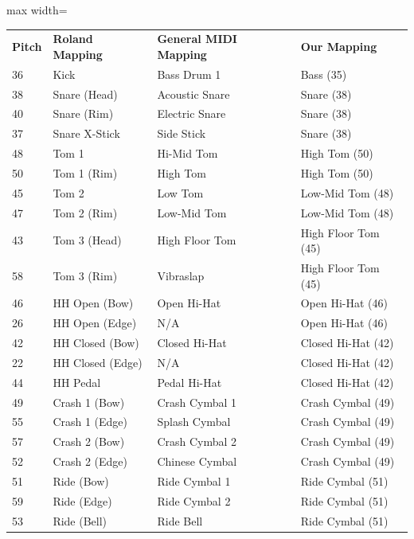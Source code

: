 \documentclass[sigconf]{nimeart}
\begin{document}
{\def\LTcaptype{none} %
\begin{table}[htbp]\centering\small
\begin{adjustbox}{max width=\textwidth}\begin{tabular}{llll}
\toprule\noalign{}
\midrule
\textbf{Pitch} & \textbf{Roland Mapping} & \textbf{General MIDI Mapping} & \textbf{Our Mapping} \\
36 & Kick & Bass Drum 1 & Bass (35) \\
38 & Snare (Head) & Acoustic Snare & Snare (38) \\
40 & Snare (Rim) & Electric Snare & Snare (38) \\
37 & Snare X-Stick & Side Stick & Snare (38) \\
48 & Tom 1 & Hi-Mid Tom & High Tom (50) \\
50 & Tom 1 (Rim) & High Tom & High Tom (50) \\
45 & Tom 2 & Low Tom & Low-Mid Tom (48) \\
47 & Tom 2 (Rim) & Low-Mid Tom & Low-Mid Tom (48) \\
43 & Tom 3 (Head) & High Floor Tom & High Floor Tom (45) \\
58 & Tom 3 (Rim) & Vibraslap & High Floor Tom (45) \\
46 & HH Open (Bow) & Open Hi-Hat & Open Hi-Hat (46) \\
26 & HH Open (Edge) & N/A & Open Hi-Hat (46) \\
42 & HH Closed (Bow) & Closed Hi-Hat & Closed Hi-Hat (42) \\
22 & HH Closed (Edge) & N/A & Closed Hi-Hat (42) \\
44 & HH Pedal & Pedal Hi-Hat & Closed Hi-Hat (42) \\
49 & Crash 1 (Bow) & Crash Cymbal 1 & Crash Cymbal (49) \\
55 & Crash 1 (Edge) & Splash Cymbal & Crash Cymbal (49) \\
57 & Crash 2 (Bow) & Crash Cymbal 2 & Crash Cymbal (49) \\
52 & Crash 2 (Edge) & Chinese Cymbal & Crash Cymbal (49) \\
51 & Ride (Bow) & Ride Cymbal 1 & Ride Cymbal (51) \\
59 & Ride (Edge) & Ride Cymbal 2 & Ride Cymbal (51) \\
53 & Ride (Bell) & Ride Bell & Ride Cymbal (51) \\
\bottomrule
\end{tabular}\end{adjustbox}\end{table}
}
\end{document}
